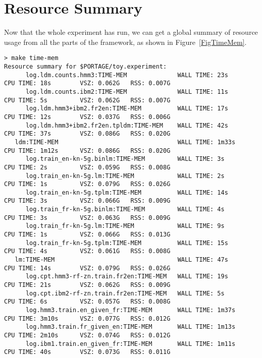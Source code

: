 \documentclass[11pt,letterpaper]{article}
\begin{document}
\section{Resource Summary}

Now that the whole experiment has run, we can get a global summary of resource
usage from all the parts of the framework, as shown in Figure~\ref{FigTimeMem}.

\begin{sidewaysfigure}
\caption{Time and memory resource summary}
\label{FigTimeMem}
\begin{footnotesize}
\begin{verbatim}
> make time-mem
Resource summary for $PORTAGE/toy.experiment:
      log.ldm.counts.hmm3:TIME-MEM              WALL TIME: 23s      CPU TIME: 18s        VSZ: 0.062G   RSS: 0.007G
      log.ldm.counts.ibm2:TIME-MEM              WALL TIME: 11s      CPU TIME: 5s         VSZ: 0.062G   RSS: 0.007G
      log.ldm.hmm3+ibm2.fr2en:TIME-MEM          WALL TIME: 17s      CPU TIME: 12s        VSZ: 0.037G   RSS: 0.006G
      log.ldm.hmm3+ibm2.fr2en.tpldm:TIME-MEM    WALL TIME: 42s      CPU TIME: 37s        VSZ: 0.086G   RSS: 0.020G
   ldm:TIME-MEM                                 WALL TIME: 1m33s    CPU TIME: 1m12s      VSZ: 0.086G   RSS: 0.020G
      log.train_en-kn-5g.binlm:TIME-MEM         WALL TIME: 3s       CPU TIME: 2s         VSZ: 0.059G   RSS: 0.008G
      log.train_en-kn-5g.lm:TIME-MEM            WALL TIME: 2s       CPU TIME: 1s         VSZ: 0.079G   RSS: 0.026G
      log.train_en-kn-5g.tplm:TIME-MEM          WALL TIME: 14s      CPU TIME: 3s         VSZ: 0.066G   RSS: 0.009G
      log.train_fr-kn-5g.binlm:TIME-MEM         WALL TIME: 4s       CPU TIME: 3s         VSZ: 0.063G   RSS: 0.009G
      log.train_fr-kn-5g.lm:TIME-MEM            WALL TIME: 9s       CPU TIME: 1s         VSZ: 0.066G   RSS: 0.013G
      log.train_fr-kn-5g.tplm:TIME-MEM          WALL TIME: 15s      CPU TIME: 4s         VSZ: 0.061G   RSS: 0.008G
   lm:TIME-MEM                                  WALL TIME: 47s      CPU TIME: 14s        VSZ: 0.079G   RSS: 0.026G
      log.cpt.hmm3-rf-zn.train.fr2en:TIME-MEM   WALL TIME: 19s      CPU TIME: 21s        VSZ: 0.062G   RSS: 0.009G
      log.cpt.ibm2-rf-zn.train.fr2en:TIME-MEM   WALL TIME: 5s       CPU TIME: 6s         VSZ: 0.057G   RSS: 0.008G
      log.hmm3.train.en_given_fr:TIME-MEM       WALL TIME: 1m37s    CPU TIME: 3m10s      VSZ: 0.077G   RSS: 0.012G
      log.hmm3.train.fr_given_en:TIME-MEM       WALL TIME: 1m13s    CPU TIME: 2m10s      VSZ: 0.074G   RSS: 0.012G
      log.ibm1.train.en_given_fr:TIME-MEM       WALL TIME: 1m11s    CPU TIME: 40s        VSZ: 0.073G   RSS: 0.011G

\end{verbatim}
\end{footnotesize}
\end{sidewaysfigure}
\end{document}
